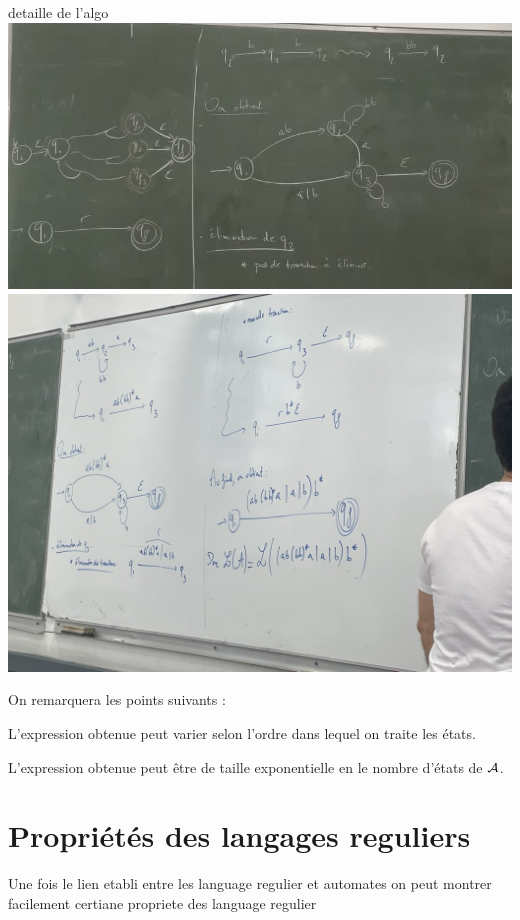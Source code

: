 \documentclass[a4paper,french,bookmarks]{book}
\begin{document}
\begin{example}{detaille de l'algo }{}
        \vspace{2cm}
        \includegraphics[scale=0.2]{Dessin/Tableau3.jpeg}
        \vspace{2cm}
        \includegraphics[scale=0.2]{Dessin/Tableau4.jpeg}
        
        
    \end{example}
    
    On remarquera les points suivants :
    \begin{enumerate}
        \itt L'expression obtenue peut varier selon l'ordre dans lequel on traite les états.
        
        \itt L'expression obtenue peut être de taille exponentielle en le nombre d'états de $\mathcal{A}$.
    \end{enumerate}
    
    \section{Propriétés des langages reguliers}
        Une fois le lien etabli entre les language regulier et automates on peut montrer facilement certiane propriete des language regulier 
        
\end{document}
